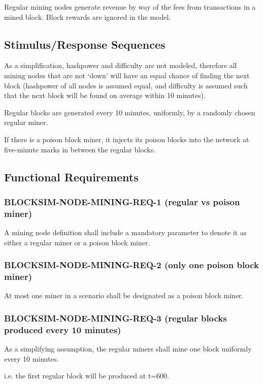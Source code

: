 \documentclass{scrreprt}
\begin{document}
Regular mining nodes generate revenue by way of the fees from transactions
in a mined block. Block rewards are ignored in the model.


\subsection{Stimulus/Response Sequences}

As a simplification, hashpower and difficulty are not modeled, therefore
all mining nodes that are not `down' will have an equal chance of finding
the next block (hashpower of all nodes is assumed equal, and difficulty
is assumed such that the next block will be found on average within 10
minutes).

Regular blocks are generated every 10 minutes, uniformly, by a randomly chosen
regular miner.

If there is a poison block miner, it injects its poison blocks into the network
at five-minute marks in between the regular blocks.


\subsection{Functional Requirements}


\subsubsection{BLOCKSIM-NODE-MINING-REQ-1 (regular vs poison miner)}

A mining node definition shall include a mandatory parameter to denote
it as either a regular miner or a poison block miner.

\subsubsection{BLOCKSIM-NODE-MINING-REQ-2 (only one poison block miner)}

At most one miner in a scenario shall be designated as a poison block
miner.

\subsubsection{BLOCKSIM-NODE-MINING-REQ-3 (regular blocks produced every 10 minutes)}

As a simplifying assumption, the regular miners shall mine one block uniformly
every 10 minutes.

i.e. the first regular block will be produced at t=600.
\end{document}

